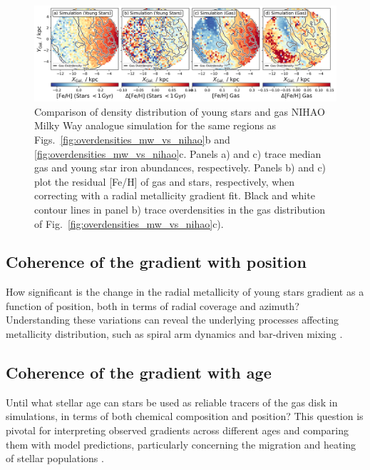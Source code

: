 \documentclass[fleqn,usenatbib]{mnras}
\begin{document}
\begin{figure}
    \centering
    \includegraphics[width=\textwidth]{figures/nihao_gas_stars_density_overlay.png}
    \caption{Comparison of density distribution of young stars and gas NIHAO Milky Way analogue simulation for the same regions as Figs.~\ref{fig:overdensities_mw_vs_nihao}b and \ref{fig:overdensities_mw_vs_nihao}c. Panels a) and c) trace median gas and young star iron abundances, respectively. Panels b) and c) plot the residual [Fe/H] of gas and stars, respectively, when correcting with a radial metallicity gradient fit. Black and white contour lines in panel b) trace overdensities in the gas distribution of Fig.~\ref{fig:overdensities_mw_vs_nihao}c).}
    \label{fig:nihao_gas_stars_density_overlay}
\end{figure}

\subsection{Coherence of the gradient with position} \label{sec:discussion_coherence_position}

How significant is the change in the radial metallicity of young stars gradient as a function of position, both in terms of radial coverage and azimuth? Understanding these variations can reveal the underlying processes affecting metallicity distribution, such as spiral arm dynamics and bar-driven mixing \citep[see their Figs. 5-8][]{DiMatteo2013}.

\subsection{Coherence of the gradient with age} \label{sec:discussion_coherence_age}

Until what stellar age can stars be used as reliable tracers of the gas disk in simulations, in terms of both chemical composition and position? This question is pivotal for interpreting observed gradients across different ages \citep[e.g.][]{Willett2023} and comparing them with model predictions, particularly concerning the migration and heating of stellar populations \citep{Binney2008, Frankel2018}.
\end{document}
